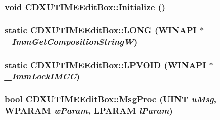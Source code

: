 \label{class_c_d_x_u_t_i_m_e_edit_box_a383dbe71ad7fe88f3a4b2e6bfd588ca4}
\hypertarget{class_c_d_x_u_t_i_m_e_edit_box_abf7a8ceb1f658ddbde5493c319edcac1}{
\subsubsection[{Initialize}]{\setlength{\rightskip}{0pt plus 5cm}void CDXUTIMEEditBox::Initialize ()}}
\label{class_c_d_x_u_t_i_m_e_edit_box_abf7a8ceb1f658ddbde5493c319edcac1}
\hypertarget{class_c_d_x_u_t_i_m_e_edit_box_a5ea3424861783fb93d639481681ee338}{
\subsubsection[{LONG}]{\setlength{\rightskip}{0pt plus 5cm}static CDXUTIMEEditBox::LONG (WINAPI $\ast$ {\em \_\-ImmGetCompositionStringW})}}
\label{class_c_d_x_u_t_i_m_e_edit_box_a5ea3424861783fb93d639481681ee338}
\hypertarget{class_c_d_x_u_t_i_m_e_edit_box_a09d09ca5bffb9f421c9c97858105586b}{
\subsubsection[{LPVOID}]{\setlength{\rightskip}{0pt plus 5cm}static {\bf CDXUTIMEEditBox::LPVOID} (WINAPI $\ast$ {\em \_\-ImmLockIMCC})}}
\label{class_c_d_x_u_t_i_m_e_edit_box_a09d09ca5bffb9f421c9c97858105586b}
\hypertarget{class_c_d_x_u_t_i_m_e_edit_box_ac656a213385fb3245938f0297d58d0de}{
\subsubsection[{MsgProc}]{\setlength{\rightskip}{0pt plus 5cm}bool CDXUTIMEEditBox::MsgProc ({\bf UINT} {\em uMsg}, \/  WPARAM {\em wParam}, \/  LPARAM {\em lParam})}}
\label{class_c_d_x_u_t_i_m_e_edit_box_ac656a213385fb3245938f0297d58d0de}


